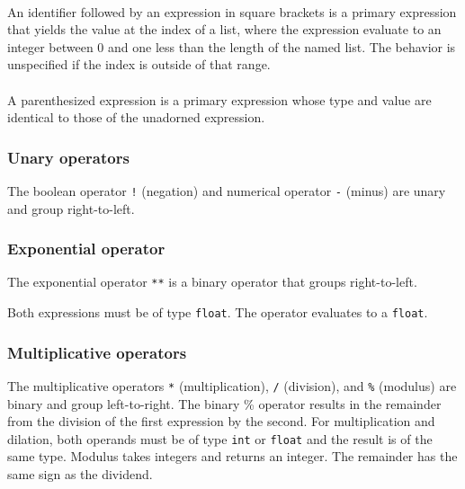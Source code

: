 \paragraph{ \term{[}  \term{]} }
An identifier followed by an expression in square brackets is a primary expression that yields the value at the  index of a list, where the expression evaluate to an integer between 0 and one less than the length of the named list. The behavior is unspecified if the index is outside of that range. 

\paragraph{\term{(}  \term{)}}
A parenthesized expression is a primary expression whose type and value are identical to those of the unadorned expression. 

\subsubsection{Unary operators}

The boolean operator \texttt{!} (negation) and numerical operator \texttt{-} (minus) are unary and group right-to-left.

\begin{alltt}
\quad \term{-} 
\quad \term{!} 
\end{alltt}

\subsubsection{Exponential operator}

The exponential operator \texttt{**} is a binary operator that groups right-to-left.
\begin{alltt}
\quad {} \term{**} 
\end{alltt}
Both expressions must be of type \texttt{float}. The operator evaluates to a \texttt{float}. 

\subsubsection{Multiplicative operators}
The multiplicative operators \texttt{*} (multiplication), \texttt{/} (division), and \texttt{\%} (modulus) are binary and group left-to-right. The  binary \% operator results in the remainder from the division of the first expression by the second. For multiplication and dilation, both operands must be of type \texttt{int} or \texttt{float} and the result is of the same type. Modulus takes integers and returns an integer. The remainder has the same sign as the dividend.

